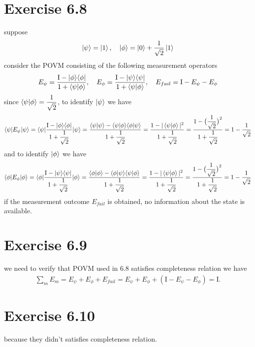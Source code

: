 \documentclass{article}
\newcommand{\op}[2]{|#1\rangle \langle#2|}
\newcommand{\sand}[3]{\braket{#1 | #2 | #3}}
\newcommand{\sandop}[3]{\braket{#1 #2 #3}}
\begin{document}
 \section*{Exercise 6.8}
 suppose
 \begin{align*}
    \ket{\psi} = \ket{1}, \quad
    \ket{\phi} = \ket{0} + \frac{1}{\sqrt{2}}\ket{1}
 \end{align*}
 consider the POVM consisting of the following measurement operators
 \begin{align*}
    E_{\psi} = \frac{\text{I} - \op{\phi}{\phi}}{1 + \braket{\psi|\phi}}, \quad
    E_{\phi} = \frac{\text{I} - \op{\psi}{\psi}}{1 + \braket{\psi|\phi}}, \quad
    E_{fail} = \text{I} - E_{\psi} - E_{\phi}
 \end{align*}
 since $\braket{\psi|\phi} = \displaystyle\frac{1}{\sqrt{2}}$, to identify $\ket{\psi}$ we have
 \begin{align*}
    \sand{\psi}{E_{\psi}}{\psi} = \sand{\psi}{\frac{\text{I} - \op{\phi}{\phi}}{\displaystyle1 + \frac{1}{\sqrt{2}}}}{\psi}
    = \frac{\braket{\psi|\psi} - \sandop{\psi}{\op{\phi}{\phi}}{\psi}}{\displaystyle1 + \frac{1}{\sqrt{2}}}
    = \frac{1 - |\braket{\psi|\phi}|^2}{\displaystyle1 + \frac{1}{\sqrt{2}}}
    = \frac{1-\displaystyle\big(\frac{1}{\sqrt{2}}\big)^2}{\displaystyle1 + \frac{1}{\sqrt{2}}}
    = 1 - \frac{1}{\sqrt{2}}
 \end{align*}
and to identify $\ket{\phi}$ we have
\begin{align*}
    \sand{\phi}{E_{\phi}}{\phi} = \sand{\phi}{\frac{\text{I} - \op{\psi}{\psi}}{\displaystyle1 + \frac{1}{\sqrt{2}}}}{\phi}
    = \frac{\braket{\phi|\phi} - \sandop{\phi}{\op{\psi}{\psi}}{\phi}}{\displaystyle1 + \frac{1}{\sqrt{2}}}
    = \frac{1 - |\braket{\psi|\phi}|^2}{\displaystyle1 + \frac{1}{\sqrt{2}}}
    = \frac{1-\displaystyle\big(\frac{1}{\sqrt{2}}\big)^2}{\displaystyle1 + \frac{1}{\sqrt{2}}}
    = 1 - \frac{1}{\sqrt{2}}
 \end{align*}
 if the measurement outcome $E_{fail}$ is obtained, no information about the state is available.
\section*{Exercise 6.9}
we need to verify that POVM used in 6.8 satisfies completeness relation we have
\begin{align*}
    \sum_m E_m = E_{\psi} + E_{\phi} + E_{fail} = E_{\psi} + E_{\phi} + ( \text{I} - E_{\psi} - E_{\phi}) = \text{I}.
\end{align*} 
\section*{Exercise 6.10}
because they didn't satisfies completeness relation.
\end{document}
